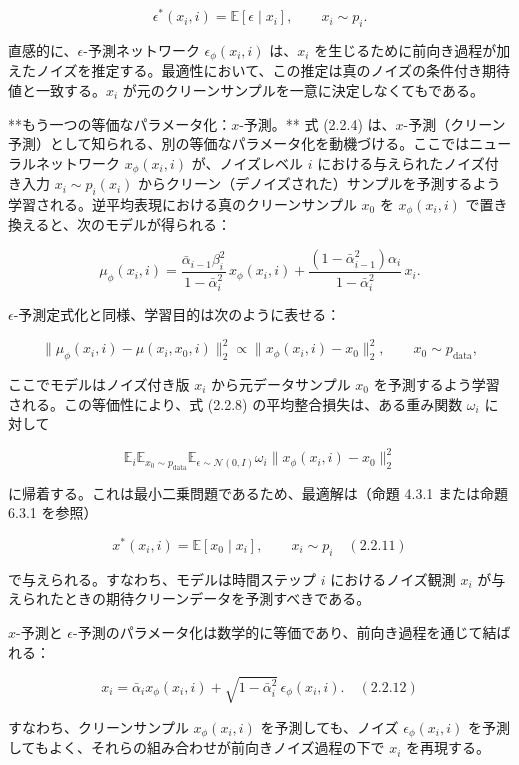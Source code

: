 \[
\epsilon^*(x_i,i) = \mathbb{E}[\epsilon\mid x_i], \qquad x_i\sim p_i.
\]


直感的に、$\epsilon$-予測ネットワーク $\epsilon_\phi(x_i,i)$ は、$x_i$ を生じるために前向き過程が加えたノイズを推定する。最適性において、この推定は真のノイズの条件付き期待値と一致する。$x_i$ が元のクリーンサンプルを一意に決定しなくてもである。

**もう一つの等価なパラメータ化：$x$-予測。** 式 (2.2.4) は、$x$-予測（クリーン予測）として知られる、別の等価なパラメータ化を動機づける。ここではニューラルネットワーク $x_\phi(x_i,i)$ が、ノイズレベル $i$ における与えられたノイズ付き入力 $x_i\sim p_i(x_i)$ からクリーン（デノイズされた）サンプルを予測するよう学習される。逆平均表現における真のクリーンサンプル $x_0$ を $x_\phi(x_i,i)$ で置き換えると、次のモデルが得られる：

\[
\mu_\phi(x_i,i) = \frac{\bar{\alpha}_{i-1}\beta_i^2}{1-\bar{\alpha}_i^2}\, x_\phi(x_i,i) + \frac{(1-\bar{\alpha}_{i-1}^2)\alpha_i}{1-\bar{\alpha}_i^2}\, x_i.
\]


$\epsilon$-予測定式化と同様、学習目的は次のように表せる：

\[
\bigl\|\mu_\phi(x_i,i)-\mu(x_i,x_0,i)\bigr\|_2^2 \propto \bigl\|x_\phi(x_i,i)-x_0\bigr\|_2^2, \qquad x_0\sim p_{\mathrm{data}},
\]


ここでモデルはノイズ付き版 $x_i$ から元データサンプル $x_0$ を予測するよう学習される。この等価性により、式 (2.2.8) の平均整合損失は、ある重み関数 $\omega_i$ に対して

\[
\mathbb{E}_{i}\mathbb{E}_{x_0\sim p_{\mathrm{data}}}\mathbb{E}_{\epsilon\sim\mathcal{N}(0,I)}\omega_i\bigl\|x_\phi(x_i,i)-x_0\bigr\|_2^2
\]


に帰着する。これは最小二乗問題であるため、最適解は（命題 4.3.1 または命題 6.3.1 を参照）

\[
x^*(x_i,i) = \mathbb{E}[x_0\mid x_i], \qquad x_i\sim p_i \quad (2.2.11)
\]


で与えられる。すなわち、モデルは時間ステップ $i$ におけるノイズ観測 $x_i$ が与えられたときの期待クリーンデータを予測すべきである。

$x$-予測と $\epsilon$-予測のパラメータ化は数学的に等価であり、前向き過程を通じて結ばれる：

\[
x_i = \bar{\alpha}_i x_\phi(x_i,i) + \sqrt{1-\bar{\alpha}_i^2}\,\epsilon_\phi(x_i,i). \quad (2.2.12)
\]


すなわち、クリーンサンプル $x_\phi(x_i,i)$ を予測しても、ノイズ $\epsilon_\phi(x_i,i)$ を予測してもよく、それらの組み合わせが前向きノイズ過程の下で $x_i$ を再現する。


